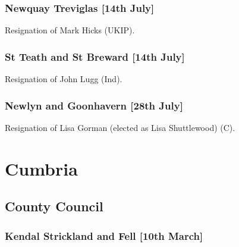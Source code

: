 \documentclass[a4paper,openany]{book}
\begin{document}
\begin{resultsiii}
\subsubsection*{Newquay Treviglas \hspace*{\fill}\nolinebreak[1]%
\enspace\hspace*{\fill}
[14th July]}


Resignation of Mark Hicks (UKIP).

\subsubsection*{St Teath and St Breward \hspace*{\fill}\nolinebreak[1]%
\enspace\hspace*{\fill}
[14th July]}


Resignation of John Lugg (Ind).

\subsubsection*{Newlyn and Goonhavern \hspace*{\fill}\nolinebreak[1]%
\enspace\hspace*{\fill}
[28th July]}


Resignation of Lisa Gorman (elected as Lisa Shuttlewood) (C).

\section{Cumbria}

\subsection*{County Council}

\subsubsection*{Kendal Strickland and Fell \hspace*{\fill}\nolinebreak[1]%
\enspace\hspace*{\fill}
[10th March]}


\end{resultsiii}
\end{document}

